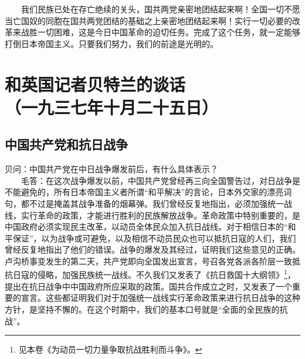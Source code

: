 \documentclass[cn,11pt,chinese]{elegantbook}
\def\myformat#1{\hfil\hfil #1}
\begin{document}
　　我们民族已处在存亡绝续的关头，国共两党亲密地团结起来啊！全国一切不愿当亡国奴的同胞在国共两党团结的基础之上亲密地团结起来啊！实行一切必要的改革来战胜一切困难，这是今日中国革命的迫切任务。完成了这个任务，就一定能够打倒日本帝国主义。只要我们努力，我们的前途是光明的。\\
\newpage\section*{\myformat{和英国记者贝特兰的谈话}\\\myformat{（一九三七年十月二十五日）}}
\subsection*{\myformat{中国共产党和抗日战争}}
贝问：中国共产党在中日战争爆发前后，有什么具体表示？\\
　　毛答：在这次战争爆发以前，中国共产党曾经再三向全国警告过，对日战争是不能避免的，所有日本帝国主义者所谓“和平解决”的言论，日本外交家的漂亮词句，都不过是掩盖其战争准备的烟幕弹。我们曾经反复地指出，必须加强统一战线，实行革命的政策，才能进行胜利的民族解放战争。革命政策中特别重要的，是中国政府必须实现民主改革，以动员全体民众加入抗日战线。对于相信日本的“和平保证”，以为战争或可避免，以及相信不动员民众也可以抵抗日寇的人们，我们曾经反复地指出了他们的错误。战争的爆发及其经过，证明我们这些意见的正确。卢沟桥事变发生的第二天，共产党即向全国发出宣言，号召各党各派各阶层一致抵抗日寇的侵略，加强民族统一战线。不久我们又发表了《抗日救国十大纲领》\footnote[1]{ 见本卷《为动员一切力量争取抗战胜利而斗争》。}，提出在抗日战争中中国政府所应采取的政策。国共合作成立之时，又发表了一个重要的宣言。这些都证明我们对于加强统一战线实行革命政策来进行抗日战争的这种方针，是坚持不懈的。在这个时期中，我们的基本口号就是“全面的全民族的抗战”。\\
\end{document}
